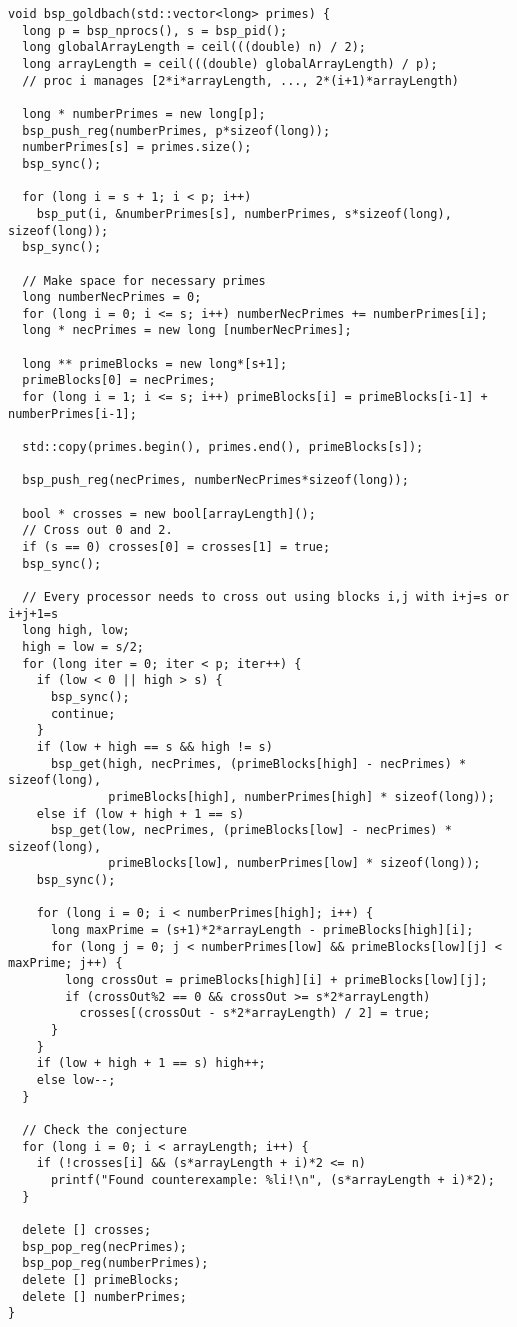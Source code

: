 \documentclass[a4paper,12pt]{article}
\begin{document}
	
	\begin{lstlisting}[caption={Extension function for checking the Goldbach conjecture}, label={prg:par_opt_sieve}, frame={single}]
void bsp_goldbach(std::vector<long> primes) {
  long p = bsp_nprocs(), s = bsp_pid();
  long globalArrayLength = ceil(((double) n) / 2);
  long arrayLength = ceil(((double) globalArrayLength) / p);
  // proc i manages [2*i*arrayLength, ..., 2*(i+1)*arrayLength)

  long * numberPrimes = new long[p];
  bsp_push_reg(numberPrimes, p*sizeof(long));
  numberPrimes[s] = primes.size();
  bsp_sync();

  for (long i = s + 1; i < p; i++)
    bsp_put(i, &numberPrimes[s], numberPrimes, s*sizeof(long), sizeof(long));
  bsp_sync();

  // Make space for necessary primes
  long numberNecPrimes = 0;
  for (long i = 0; i <= s; i++) numberNecPrimes += numberPrimes[i];
  long * necPrimes = new long [numberNecPrimes];

  long ** primeBlocks = new long*[s+1];
  primeBlocks[0] = necPrimes;
  for (long i = 1; i <= s; i++) primeBlocks[i] = primeBlocks[i-1] + numberPrimes[i-1];

  std::copy(primes.begin(), primes.end(), primeBlocks[s]);

  bsp_push_reg(necPrimes, numberNecPrimes*sizeof(long));

  bool * crosses = new bool[arrayLength]();
  // Cross out 0 and 2.
  if (s == 0) crosses[0] = crosses[1] = true;
  bsp_sync();

  // Every processor needs to cross out using blocks i,j with i+j=s or i+j+1=s
  long high, low;
  high = low = s/2;
  for (long iter = 0; iter < p; iter++) {
    if (low < 0 || high > s) {
      bsp_sync();
      continue;
    }
    if (low + high == s && high != s)
      bsp_get(high, necPrimes, (primeBlocks[high] - necPrimes) * sizeof(long),
              primeBlocks[high], numberPrimes[high] * sizeof(long));
    else if (low + high + 1 == s)
      bsp_get(low, necPrimes, (primeBlocks[low] - necPrimes) * sizeof(long),
              primeBlocks[low], numberPrimes[low] * sizeof(long));
    bsp_sync();

    for (long i = 0; i < numberPrimes[high]; i++) {
      long maxPrime = (s+1)*2*arrayLength - primeBlocks[high][i];
      for (long j = 0; j < numberPrimes[low] && primeBlocks[low][j] < maxPrime; j++) {
        long crossOut = primeBlocks[high][i] + primeBlocks[low][j];
        if (crossOut%2 == 0 && crossOut >= s*2*arrayLength)
          crosses[(crossOut - s*2*arrayLength) / 2] = true;
      }
    }
    if (low + high + 1 == s) high++;
    else low--;
  }

  // Check the conjecture
  for (long i = 0; i < arrayLength; i++) {
    if (!crosses[i] && (s*arrayLength + i)*2 <= n)
      printf("Found counterexample: %li!\n", (s*arrayLength + i)*2);
  }

  delete [] crosses;
  bsp_pop_reg(necPrimes);
  bsp_pop_reg(numberPrimes);
  delete [] primeBlocks;
  delete [] numberPrimes;
}
	\end{lstlisting}
\end{document}
